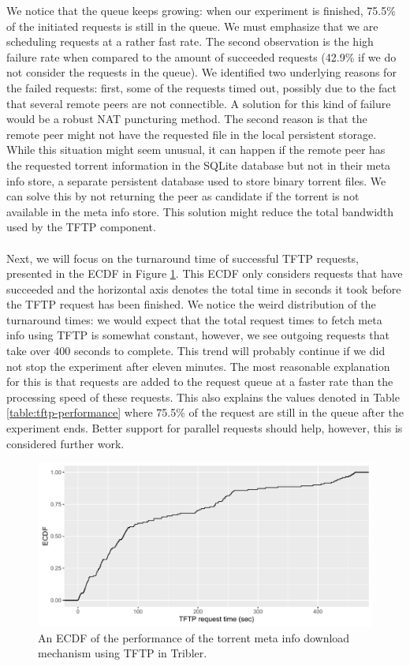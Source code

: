 \noindent We notice that the queue keeps growing: when our experiment is finished, 75.5\% of the initiated requests is still in the queue. We must emphasize that we are scheduling requests at a rather fast rate. The second observation is the high failure rate when compared to the amount of succeeded requests (42.9\% if we do not consider the requests in the queue). We identified two underlying reasons for the failed requests: first, some of the requests timed out, possibly due to the fact that several remote peers are not connectible. A solution for this kind of failure would be a robust NAT puncturing method. The second reason is that the remote peer might not have the requested file in the local persistent storage. While this situation might seem unusual, it can happen if the remote peer has the requested torrent information in the SQLite database but not in their meta info store, a separate persistent database used to store binary torrent files. We can solve this by not returning the peer as candidate if the torrent is not available in the meta info store. This solution might reduce the total bandwidth used by the TFTP component.\\\\
Next, we will focus on the turnaround time of successful TFTP requests, presented in the ECDF in Figure \ref{fig:tftp-performance-success}. This ECDF only considers requests that have succeeded and the horizontal axis denotes the total time in seconds it took before the TFTP request has been finished. We notice the weird distribution of the turnaround times: we would expect that the total request times to fetch meta info using TFTP is somewhat constant, however, we see outgoing requests that take over 400 seconds to complete. This trend will probably continue if we did not stop the experiment after eleven minutes. The most reasonable explanation for this is that requests are added to the request queue at a faster rate than the processing speed of these requests. This also explains the values denoted in Table \ref{table:tftp-performance} where 75.5\% of the request are still in the queue after the experiment ends. Better support for parallel requests should help, however, this is considered further work.

\begin{figure}[!h]
	\centering
	\includegraphics[width=1.0\columnwidth]{images/experiments/tftp_performance}
	\caption{An ECDF of the performance of the torrent meta info download mechanism using TFTP in Tribler.}
	\label{fig:tftp-performance-success}
\end{figure}

